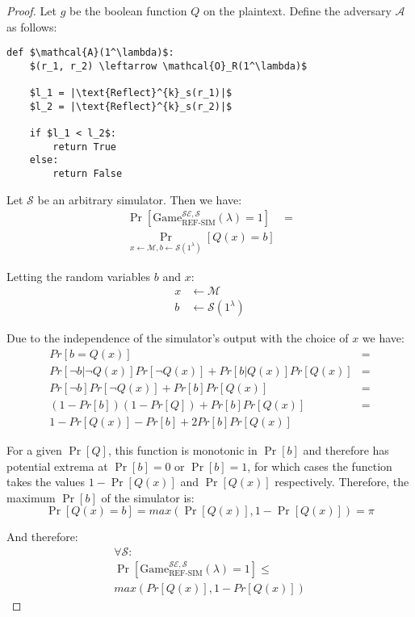 \begin{proof}

Let $g$ be the boolean function $Q$ on the plaintext. Define the adversary
$\mathcal{A}$ as follows:

\begin{lstlisting}[texcl,mathescape,basicstyle=\small]
def $\mathcal{A}(1^\lambda)$:
    $(r_1, r_2) \leftarrow \mathcal{O}_R(1^\lambda)$

    $l_1 = |\text{Reflect}^{k}_s(r_1)|$
    $l_2 = |\text{Reflect}^{k}_s(r_2)|$

    if $l_1 < l_2$:
        return True
    else:
        return False
\end{lstlisting}

Let $\mathcal{S}$ be an arbitrary simulator. Then we have:
\begin{align*}
    \Pr[\text{Game}_{\text{REF-SIM}}^{\mathcal{SE},\mathcal{S}}
        (\lambda) = 1] &=\\
    \Pr_{x \leftarrow \mathcal{M}, b \leftarrow \mathcal{S}(1^\lambda)}
        [Q(x) = b]
\end{align*}

Letting the random variables $b$ and $x$:
\begin{align*}
    x &\leftarrow \mathcal{M}\\
    b &\leftarrow \mathcal{S}(1^\lambda)
\end{align*}

Due to the independence of the simulator's output with the choice of $x$ we have:
\begin{align*}
    Pr[b = Q(x)] &=\\
    Pr[\lnot b|\lnot Q(x)]Pr[\lnot Q(x)] + Pr[b|Q(x)]Pr[Q(x)] &=\\
    Pr[\lnot b]Pr[\lnot Q(x)] + Pr[b]Pr[Q(x)] &=\\
    (1 - Pr[b])(1 - Pr[Q]) + Pr[b]Pr[Q(x)] &=\\
    1 - Pr[Q(x)] - Pr[b] + 2Pr[b]Pr[Q(x)]
\end{align*}

For a given $\Pr[Q]$, this function is monotonic in $\Pr[b]$ and therefore has
potential extrema at $\Pr[b] = 0$ or $\Pr[b] = 1$, for which cases the function
takes the values $1 - \Pr[Q(x)]$ and $\Pr[Q(x)]$ respectively. Therefore, the
maximum $\Pr[b]$ of the simulator is:
\begin{equation*}
    \Pr[Q(x) = b] = max(\Pr[Q(x)], 1 - \Pr[Q(x)]) = \pi
\end{equation*}

And therefore:
\begin{align*}
    \forall \mathcal{S}:\\
    \Pr[
        \text{Game}_{\text{REF-SIM}}^{\mathcal{SE},\mathcal{S}}
        (\lambda) = 1
    ]
    \leq\\
    max(Pr[Q(x)], 1 - Pr[Q(x)])
\end{align*}


\end{proof}

